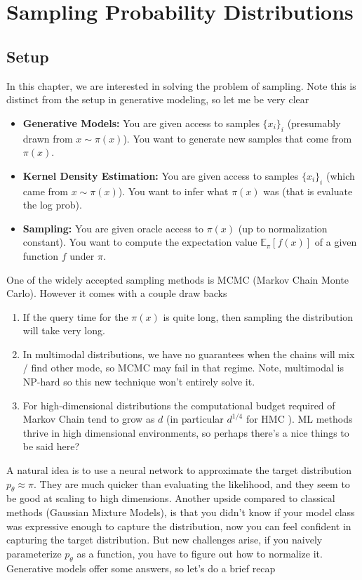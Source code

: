 \section{Sampling Probability Distributions}
\subsection{Setup}
In this chapter, we are interested in solving the problem of sampling. Note this is distinct from the setup in generative modeling, so let me be very clear
\begin{itemize}
	\item \textbf{Generative Models:} You are given access to samples $\{x_i\}_i$ (presumably drawn from $x \sim \pi(x)$). You want to generate new samples that come from $\pi(x)$.
	\item \textbf{Kernel Density Estimation:} You are given access to samples $\{x_i\}_i$ (which came from $x \sim \pi(x)$). You want to infer what $\pi(x)$ was (that is evaluate the log prob).
	\item \textbf{Sampling:} You are given oracle access to $\pi(x)$ (up to normalization constant). You want to compute the expectation value $\mathbb E_\pi[f(x)]$ of a given function $f$ under $\pi$.
\end{itemize}  
One of the widely accepted sampling methods is MCMC (Markov Chain Monte Carlo). However it comes with a couple draw backs
\begin{enumerate}
	\item If the query time for the $\pi(x)$  is quite long, then sampling the distribution will take very long.
	\item In multimodal distributions, we have no guarantees when the chains will mix / find other mode, so MCMC may fail in that regime. Note, multimodal is NP-hard so this new technique won't entirely solve it.
	\item For high-dimensional distributions the computational budget required of Markov Chain tend to grow as $d$ (in particular $d^{1/4}$ for HMC \cite{hmc_scaling}). ML methods thrive in high dimensional environments, so perhaps there's a nice things to be said here?
\end{enumerate}
A natural idea is to use a neural network to approximate the target distribution $p_\theta \approx \pi$. They are much quicker than evaluating the likelihood, and they seem to be good at scaling to high dimensions. Another upside compared to classical methods (Gaussian Mixture Models), is that you didn't know if your model class was expressive enough to capture the distribution, now you can feel confident in capturing the target distribution. But new challenges arise, if you naively parameterize $p_\theta$ as a function, you have to figure out how to normalize it. Generative models offer some answers, so let's do a brief recap
